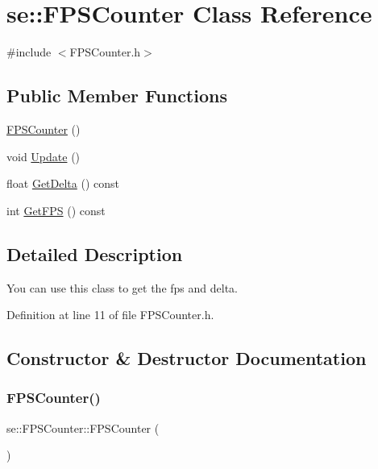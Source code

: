 \hypertarget{classse_1_1_f_p_s_counter}{}\section{se\+:\+:F\+P\+S\+Counter Class Reference}
\label{classse_1_1_f_p_s_counter}


{\ttfamily \#include $<$F\+P\+S\+Counter.\+h$>$}

\subsection*{Public Member Functions}
\begin{DoxyCompactItemize}
\item 
\mbox{\hyperlink{classse_1_1_f_p_s_counter_ad9b3e1f8314a41194aced879a346d32b}{F\+P\+S\+Counter}} ()
\item 
void \mbox{\hyperlink{classse_1_1_f_p_s_counter_a863da58355d25fcf9f76b9cc697101e4}{Update}} ()
\item 
float \mbox{\hyperlink{classse_1_1_f_p_s_counter_ac39be1bd1ff3954813d6d5733825abb1}{Get\+Delta}} () const
\item 
int \mbox{\hyperlink{classse_1_1_f_p_s_counter_a6e3fc56e01f9696ce549264f6246fa01}{Get\+F\+PS}} () const
\end{DoxyCompactItemize}


\subsection{Detailed Description}
You can use this class to get the fps and delta. 

Definition at line 11 of file F\+P\+S\+Counter.\+h.



\subsection{Constructor \& Destructor Documentation}
\mbox{\label{classse_1_1_f_p_s_counter_ad9b3e1f8314a41194aced879a346d32b}} 
\subsubsection{\texorpdfstring{F\+P\+S\+Counter()}{FPSCounter()}}
{\footnotesize\ttfamily se\+::\+F\+P\+S\+Counter\+::\+F\+P\+S\+Counter (\begin{DoxyParamCaption}{ }\end{DoxyParamCaption})}



